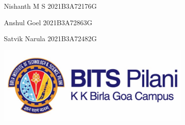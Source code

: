 \documentclass{article} %
\begin{document}


\noindent \textbf{    }

\noindent \textbf{}

\noindent \textbf{                                                                                 }

\noindent \textbf{\underbar{}}

\noindent \textbf{                                                                                                    }

\noindent Nishanth M S                                                                                                               2021B3A72176G

\noindent Anshul Goel                                                                                                                  2021B3A72863G

\noindent Satvik Narula                                                                                                                2021B3A72482G

\noindent 

\noindent                                                                      

\noindent 

\noindent 

\noindent 

\noindent                                \includegraphics*[width=3.81in, height=1.52in]{image1}

\textbf{\underbar{}}

\textbf{\underbar{}}

\textbf{\underbar{}}

\textbf{\underbar{}}

\noindent \textbf{\underbar{}}

\noindent \textbf{\underbar{}}
\end{document}

